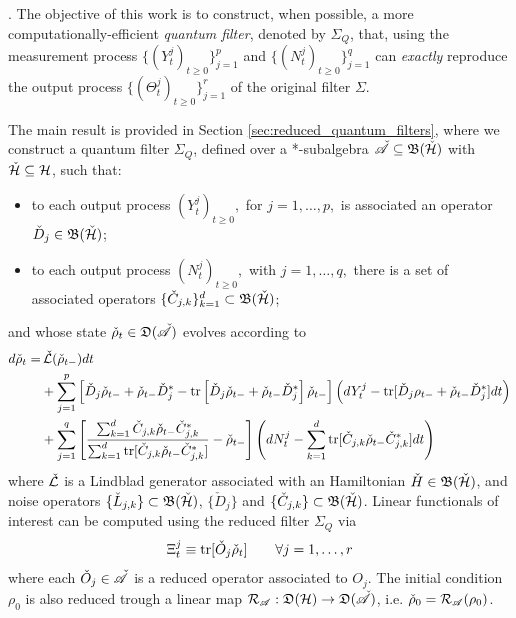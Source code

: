 \documentclass[aihp,12pt]{imsart}
\begin{document}
. The objective of this work is to construct, when possible, a more computationally-efficient  {\em quantum filter}, denoted by $\Sigma_Q$, that, using the measurement process $\{(Y_t^j)_{t\geq0}\}_{j=1}^p$ and $\{(N_t^j)_{t\geq0}\}_{j=1}^q$ can {\em exactly} reproduce the output process $\{(\Theta_t^j)_{t\geq0}\}_{j=1}^r$ of the original filter $\Sigma$. 

The main result is provided in Section \ref{sec:reduced_quantum_filters}, where we construct a quantum filter ${\Sigma}_Q$, defined over a *-subalgebra $\check{\mathscr{A}}\subseteq\mathfrak{B}(\check{\mathcal{H}})$ with $\check{\mathcal{H}}\subseteq\mathcal{H}$, such that: 
\begin{itemize}
    \item to each output process $(Y_t^j)_{t\geq0},$ for $j=1,\dots,p,$  is associated an operator \(\check{D}_j\in\mathfrak{B}(\check{\mathcal{H}})\);
    \item to each output process $(N_t^j)_{t\geq0},$ with  $j=1,\dots,q,$ there is a set of associated operators $\{\check{C}_{j,k}\}_{k=1}^d\subset\mathfrak{B}(\check{\mathcal{H}})$;
\end{itemize}
and whose state $\check{\rho}_t\in\mathfrak{D}(\check{\mathscr{A}})$ evolves according to 
\begin{equation}
    \begin{split}
        d\check{\rho}_t = &\,\check{\mathcal{L}}(\check{\rho}_{t-}) dt \\&+ \sum_{j=1}^{p}\left[\check{D}_j\check{\rho}_{t-}+\check\rho_{t-} {\check{D}_j}^* - {\rm tr}\left[\check{D}_j\check\rho_{t-}+\check\rho_{t-} {\check{D}_j}^*\right]\check{\rho}_{t-}\right] \left(dY_t^j - {\rm tr}[\check{D}_j\rho_{t-}+\check\rho_{t-} {\check{D}_j}^*]dt\right)\\ &+ \sum_{j=1}^{q} \left[  \frac{\sum_{k=1}^d\check{C}_{j,k}\check\rho_{t-}\check{C}_{j,k}^*}{\sum_{k=1}^d{\rm tr}[\check{C}_{j,k}\check\rho_{t-}\check{C}_{j,k}^*]} - \check{\rho}_{t-} \right]\left(dN_t^j-\sum_{k=1}^d{\rm tr}[\check{C}_{j,k}\check\rho_{t-}\check{C}_{j,k}^*]dt\right)
    \end{split}
    \label{eq:reduced_quantum_filter}
\end{equation}
where $\check{\mathcal{L}}$ is a Lindblad generator associated with an Hamiltonian $\check{H}\in\mathfrak{B}(\check{\mathcal{H}})$, and noise operators \(\{\check{L}_{j,k}\}\subset\mathfrak{B}(\check{\mathcal{H}})\), $\{\check{D}_{j}\}$ and $\{\check{C}_{j,k}\}\subset\mathfrak{B}(\check{\mathcal{H}})$. 
Linear functionals of interest can be computed using the reduced filter $\Sigma_Q$ via 
\begin{equation}
     \Xi_t^j \equiv {\rm tr}[\check{O}_j\check{\rho}_t]\qquad\forall j=1,\dots,r
\end{equation}
where each $\check{O}_j\in\check{\mathscr{A}}$ is a reduced operator associated to $O_j$. The initial condition \(\rho_0\) is also reduced trough a linear map $\mathcal{R}_{\mathscr{A}}:\mathfrak{D}(\mathcal{H})\to\mathfrak{D}(\check{\mathscr{A}})$, i.e. $\check{\rho}_0=\mathcal{R}_{\mathscr{A}}(\rho_0)$.
\end{document}
